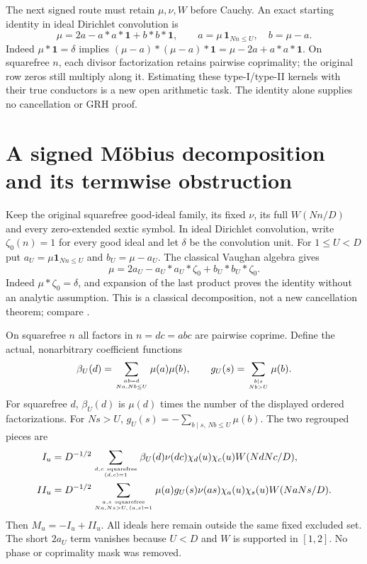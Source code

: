 \documentclass[11pt,oneside,openany]{book}
\theoremstyle{definition}\newtheorem{definition}[theorem]{Definition}
\theoremstyle{remark}\newtheorem{remark}[theorem]{Remark}
\begin{document}
The next signed route must retain $\mu,\nu,W$ before Cauchy. An exact
starting identity in ideal Dirichlet convolution is
\[
 \mu=2a-a*a*\mathbf1+b*b*\mathbf1,\qquad
 a=\mu\,\mathbf1_{Nn\le U},\quad b=\mu-a.
\]
Indeed $\mu*\mathbf1=\delta$ implies
$(\mu-a)*(\mu-a)*\mathbf1=\mu-2a+a*a*\mathbf1$.
On squarefree $n$, each divisor factorization retains pairwise
coprimality; the original row zeros still multiply along it. Estimating
these type-I/type-II kernels with their true conductors is a new open
arithmetic task. The identity alone supplies no cancellation or GRH proof.

\section{A signed M\"obius decomposition and its termwise obstruction}
\label{sec:mobius-split}
Keep the original squarefree good-ideal family, its fixed $\nu$, its
full $W(Nn/D)$ and every zero-extended sextic symbol. In ideal Dirichlet
convolution, write $\zeta_0(n)=1$ for every good ideal and let $\delta$
be the convolution unit. For $1\le U<D$ put
$a_U=\mu\mathbf1_{Nn\le U}$ and $b_U=\mu-a_U$. The classical Vaughan
algebra gives
\begin{equation}\label{eq:mobius-split}
 \mu=2a_U-a_U*a_U*\zeta_0+b_U*b_U*\zeta_0.
\end{equation}
Indeed $\mu*\zeta_0=\delta$, and expansion of the last product proves the
identity without an analytic assumption. This is a classical decomposition,
not a new cancellation theorem; compare \cite[Lemma4.1]{GreenTaoVaughan}.

On squarefree $n$ all factors in $n=d c=a b c$ are pairwise coprime.
Define the actual, nonarbitrary coefficient functions
\[
 \beta_U(d)=\sum_{ab=d\atop Na,Nb\le U}\mu(a)\mu(b),\qquad
 g_U(s)=\sum_{b\mid s\atop Nb>U}\mu(b).
\]
For squarefree $d$, $\beta_U(d)$ is $\mu(d)$ times the number of the
displayed ordered factorizations. For $Ns>U$,
$g_U(s)=-\sum_{b\mid s,\,Nb\le U}\mu(b)$. The two regrouped pieces are
\begin{align*}
 I_u&=D^{-1/2}\sum_{d,c\ {\rm squarefree}\atop(d,c)=1}
  \beta_U(d)\nu(dc)\chi_d(u)\chi_c(u)W(NdNc/D),\\
 II_u&=D^{-1/2}\sum_{a,s\ {\rm squarefree}\atop Na,Ns>U,\,(a,s)=1}
  \mu(a)g_U(s)\nu(as)\chi_a(u)\chi_s(u)W(NaNs/D).
\end{align*}
Then $M_u=-I_u+II_u$. All ideals here remain outside the same fixed
excluded set. The short $2a_U$ term vanishes because $U<D$ and $W$ is
supported in $[1,2]$. No phase or coprimality mask was removed.
\end{document}
